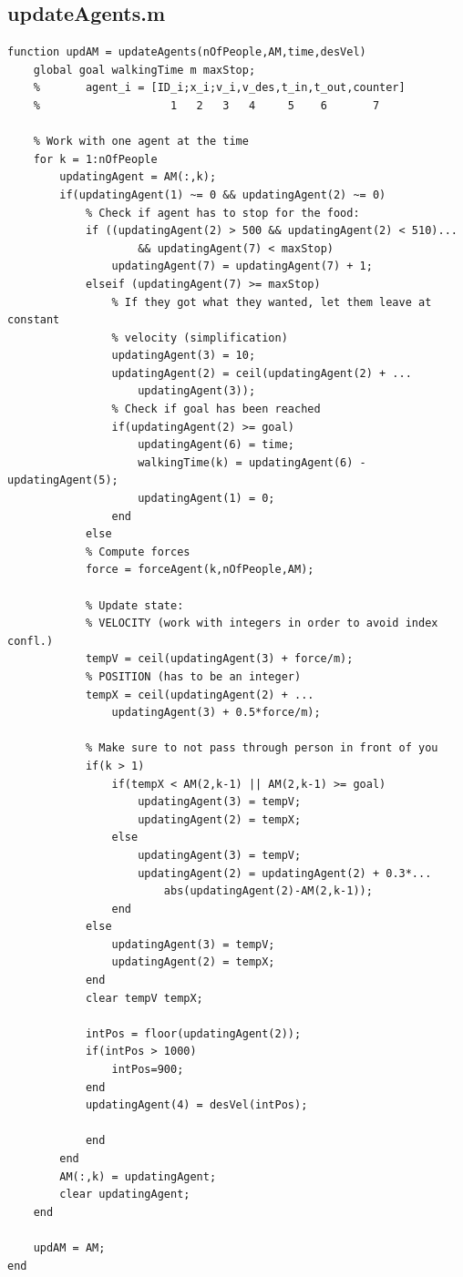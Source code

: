\documentclass[11pt]{article}
\begin{document}
\subsection*{updateAgents.m}
\begin{lstlisting}[frame=lines]
function updAM = updateAgents(nOfPeople,AM,time,desVel)
    global goal walkingTime m maxStop;
    %       agent_i = [ID_i;x_i;v_i,v_des,t_in,t_out,counter]
    %                    1   2   3   4     5    6       7

    % Work with one agent at the time
    for k = 1:nOfPeople
        updatingAgent = AM(:,k);
        if(updatingAgent(1) ~= 0 && updatingAgent(2) ~= 0)
            % Check if agent has to stop for the food:
            if ((updatingAgent(2) > 500 && updatingAgent(2) < 510)...
                    && updatingAgent(7) < maxStop)
                updatingAgent(7) = updatingAgent(7) + 1; 
            elseif (updatingAgent(7) >= maxStop)
                % If they got what they wanted, let them leave at constant
                % velocity (simplification)
                updatingAgent(3) = 10;
                updatingAgent(2) = ceil(updatingAgent(2) + ...
                    updatingAgent(3));
                % Check if goal has been reached
                if(updatingAgent(2) >= goal)
                    updatingAgent(6) = time;
                    walkingTime(k) = updatingAgent(6) - updatingAgent(5);
                    updatingAgent(1) = 0;
                end
            else
            % Compute forces
            force = forceAgent(k,nOfPeople,AM);
          
            % Update state:
            % VELOCITY (work with integers in order to avoid index confl.)
            tempV = ceil(updatingAgent(3) + force/m);
            % POSITION (has to be an integer)
            tempX = ceil(updatingAgent(2) + ...
                updatingAgent(3) + 0.5*force/m);
            
            % Make sure to not pass through person in front of you
            if(k > 1)
                if(tempX < AM(2,k-1) || AM(2,k-1) >= goal)
                    updatingAgent(3) = tempV;
                    updatingAgent(2) = tempX;
                else
                    updatingAgent(3) = tempV;
                    updatingAgent(2) = updatingAgent(2) + 0.3*...
                        abs(updatingAgent(2)-AM(2,k-1));
                end
            else
                updatingAgent(3) = tempV;
                updatingAgent(2) = tempX;
            end
            clear tempV tempX;     
            
            intPos = floor(updatingAgent(2));
            if(intPos > 1000)
                intPos=900;
            end
            updatingAgent(4) = desVel(intPos);
            
            end
        end
        AM(:,k) = updatingAgent;
        clear updatingAgent;
    end
    
    updAM = AM;
end
\end{lstlisting}
\end{document}
